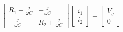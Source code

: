 \begin{equation}\label{eq:9.69.3}
    \begin{bmatrix}
        R_1 - \frac{j}{\omega C} & - \frac{j}{\omega C} \\
        - \frac{j}{\omega C} & R_2 + \frac{j}{\omega C}
    \end{bmatrix}
    \begin{bmatrix}
        i_1 \\
        i_2
    \end{bmatrix}
    =
    \begin{bmatrix}
        V_g \\
        0
    \end{bmatrix}
\end{equation}


















